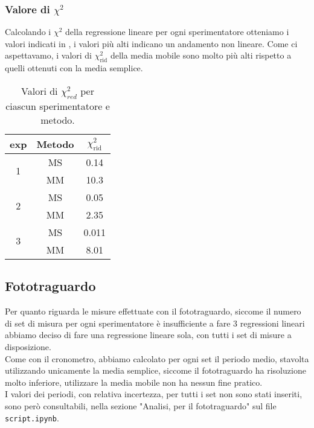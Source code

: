 \subsubsection*{Valore di \texorpdfstring{$\chi^2$}{chi quadro}}
Calcolando i $\chi^2$ della regressione lineare per ogni sperimentatore otteniamo i valori indicati in , i valori più alti indicano un andamento non lineare. Come ci aspettavamo, i valori di $\chi^2_\text{rid}$ della media mobile sono molto più alti rispetto a quelli ottenuti con la media semplice.

\begin{table}[h]
\centering
\begin{tabular}{c|c|c}
exp & Metodo & \(\chi^2_\text{rid}\) \\
\hline
\multirow{2}{*}{1} & MS & 0.14 \\
                        & MM & 10.3 \\
\hline
\multirow{2}{*}{2} & MS & 0.05 \\
                         & MM & 2.35 \\
\hline
\multirow{2}{*}{3} & MS & 0.011 \\
                         & MM & 8.01 \\
\end{tabular}
\caption{Valori di \(\chi^2_{red}\) per ciascun sperimentatore e metodo.}
\label{tab:chi2red_values}
\end{table}

\subsection{Fototraguardo}
Per quanto riguarda le misure effettuate con il fototraguardo, siccome il numero di set di misura per ogni sperimentatore è insufficiente a fare 3 regressioni lineari abbiamo deciso di fare una regressione lineare sola, con tutti i set di misure a disposizione.\\

Come con il cronometro, abbiamo calcolato per ogni set il periodo medio, stavolta utilizzando unicamente la media semplice, siccome il fototraguardo ha risoluzione molto inferiore, utilizzare la media mobile non ha nessun fine pratico.\\

I valori dei periodi, con relativa incertezza, per tutti i set non sono stati inseriti, sono però consultabili, nella sezione "Analisi, per il fototraguardo" sul file \verb|script.ipynb|.\\

